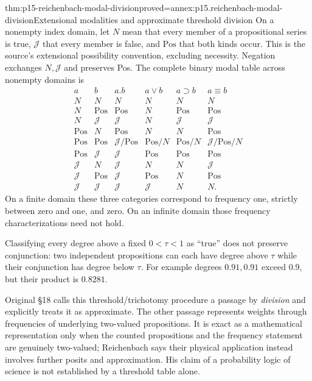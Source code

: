 \begin{hbtheorem}{thm:p15-reichenbach-modal-division}{proved=annex:p15.reichenbach-modal-division}{Extensional modalities and approximate threshold division}
On a nonempty index domain, let \(N\) mean that every member of
a propositional series is true, \(\mathcal J\) that every member
is false, and \(\mathrm{Pos}\) that both kinds occur. This is
the source's extensional possibility convention, excluding necessity.
Negation exchanges \(N,\mathcal J\) and preserves Pos. The
complete binary modal table across nonempty domains is
\[
\begin{array}{cc|cccc}
 a&b&a.b&a\lor b&a\supset b&a\equiv b\\\hline
 N&N&N&N&N&N\\
 N&\mathrm{Pos}&\mathrm{Pos}&N&\mathrm{Pos}&\mathrm{Pos}\\
 N&\mathcal J&\mathcal J&N&\mathcal J&\mathcal J\\
 \mathrm{Pos}&N&\mathrm{Pos}&N&N&\mathrm{Pos}\\
 \mathrm{Pos}&\mathrm{Pos}&\mathcal J/\mathrm{Pos}&\mathrm{Pos}/N&
           \mathrm{Pos}/N&\mathcal J/\mathrm{Pos}/N\\
 \mathrm{Pos}&\mathcal J&\mathcal J&\mathrm{Pos}&\mathrm{Pos}&\mathrm{Pos}\\
 \mathcal J&N&\mathcal J&N&N&\mathcal J\\
 \mathcal J&\mathrm{Pos}&\mathcal J&\mathrm{Pos}&N&\mathrm{Pos}\\
 \mathcal J&\mathcal J&\mathcal J&\mathcal J&N&N.
\end{array}
\]
On a finite domain these three categories correspond to frequency
one, strictly between zero and one, and zero. On an infinite domain
those frequency characterizations need not hold.

Classifying every degree above a fixed \(0<\tau<1\) as ``true''
does not preserve conjunction: two independent propositions can each
have degree above \(\tau\) while their conjunction has degree below
\(\tau\). For example degrees \(0.91,0.91\) exceed \(0.9\),
but their product is \(0.8281\).
\end{hbtheorem}

Original §18 calls this threshold/trichotomy procedure a passage by
\emph{division} and explicitly treats it as approximate. The other
passage represents weights through frequencies of underlying two-valued
propositions. It is exact as a mathematical representation only when
the counted propositions and the frequency statement are genuinely
two-valued; Reichenbach says their physical application instead
involves further posits and approximation. His claim of a probability
logic of science is not established by a threshold table alone.

